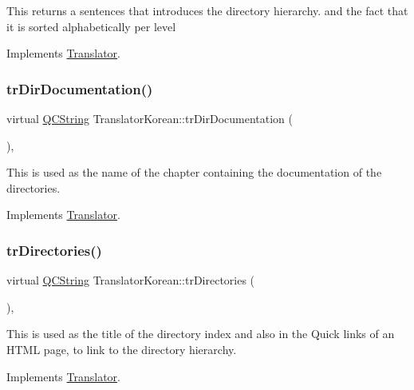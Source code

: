 This returns a sentences that introduces the directory hierarchy. and the fact that it is sorted alphabetically per level 

Implements \mbox{\hyperlink{class_translator}{Translator}}.

\mbox{\label{class_translator_korean_ade40cfebcc4dd63032402d8fab3dcd66}} 
\subsubsection{\texorpdfstring{trDirDocumentation()}{trDirDocumentation()}}
{\footnotesize\ttfamily virtual \mbox{\hyperlink{class_q_c_string}{Q\+C\+String}} Translator\+Korean\+::tr\+Dir\+Documentation (\begin{DoxyParamCaption}{ }\end{DoxyParamCaption})\hspace{0.3cm}{\ttfamily [inline]}, {\ttfamily [virtual]}}

This is used as the name of the chapter containing the documentation of the directories. 

Implements \mbox{\hyperlink{class_translator}{Translator}}.

\mbox{\label{class_translator_korean_aaf735e849b61302e9546a94fb545ca0e}} 
\subsubsection{\texorpdfstring{trDirectories()}{trDirectories()}}
{\footnotesize\ttfamily virtual \mbox{\hyperlink{class_q_c_string}{Q\+C\+String}} Translator\+Korean\+::tr\+Directories (\begin{DoxyParamCaption}{ }\end{DoxyParamCaption})\hspace{0.3cm}{\ttfamily [inline]}, {\ttfamily [virtual]}}

This is used as the title of the directory index and also in the Quick links of an H\+T\+ML page, to link to the directory hierarchy. 

Implements \mbox{\hyperlink{class_translator}{Translator}}.

